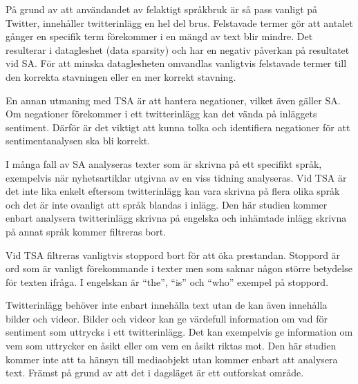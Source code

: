 \documentclass{kaumasters} %
\begin{document}
På grund av att användandet av felaktigt språkbruk är så pass vanligt på Twitter, innehåller twitterinlägg en hel del brus. Felstavade termer gör att antalet gånger en specifik term förekommer i en mängd av text blir mindre. Det resulterar i datagleshet (data sparsity) och har en negativ påverkan på resultatet vid SA. För att minska dataglesheten omvandlas vanligtvis felstavade termer till den korrekta stavningen eller en mer korrekt stavning.

En annan utmaning med TSA är att hantera negationer, vilket även gäller SA. Om negationer förekommer i ett twitterinlägg kan det vända på inläggets sentiment. Därför är det viktigt att kunna tolka och identifiera negationer för att sentimentanalysen ska bli korrekt.

I många fall av SA analyseras texter som är skrivna på ett specifikt språk, exempelvis när nyhetsartiklar utgivna av en viss tidning analyseras. Vid TSA är det inte lika enkelt eftersom twitterinlägg kan vara skrivna på flera olika språk och det är inte ovanligt att språk blandas i inlägg. Den här studien kommer enbart analysera twitterinlägg skrivna på engelska och inhämtade inlägg skrivna på annat språk kommer filtreras bort. 

Vid TSA filtreras vanligtvis stoppord bort för att öka prestandan. Stoppord är ord som är vanligt förekommande i texter men som saknar någon större betydelse för texten ifråga. I engelskan är “the”, “is” och “who” exempel på stoppord.

Twitterinlägg behöver inte enbart innehålla text utan de kan även innehålla bilder och videor. Bilder och videor kan ge värdefull information om vad för sentiment som uttrycks i ett twitterinlägg. Det kan exempelvis ge information om vem som uttrycker en åsikt eller om vem en åsikt riktas mot. Den här studien kommer inte att ta hänsyn till mediaobjekt utan kommer enbart att analysera text. Främst på grund av att det i dagsläget är ett outforskat område.
\end{document}
